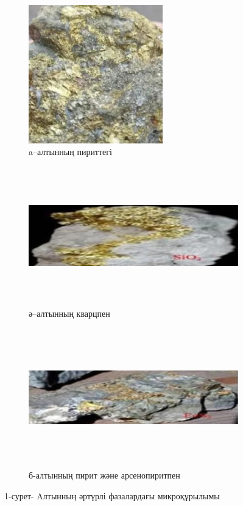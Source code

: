 \begin{figure}[H]
    \centering
    \begin{subfigure}[b]{0.32\textwidth}
        \centering
        \includegraphics[width=\textwidth, height=6cm]{media/gor/image1}
        \caption*{a--алтынның пириттегі}
    \end{subfigure}
    \hfill
    \begin{subfigure}[b]{0.32\textwidth}
        \centering
        \includegraphics[width=\textwidth, height=6cm]{media/gor/image2}
        \caption*{ә--алтынның кварцпен}
    \end{subfigure}
    \hfill
    \begin{subfigure}[b]{0.32\textwidth}
        \centering
        \includegraphics[width=\textwidth, height=6cm]{media/gor/image3}
        \caption*{б-алтынның пирит және арсенопиритпен}
    \end{subfigure}
    \caption*{1-сурет- Aлтынның әртүрлі фазалардағы микроқұрылымы}
\end{figure}



